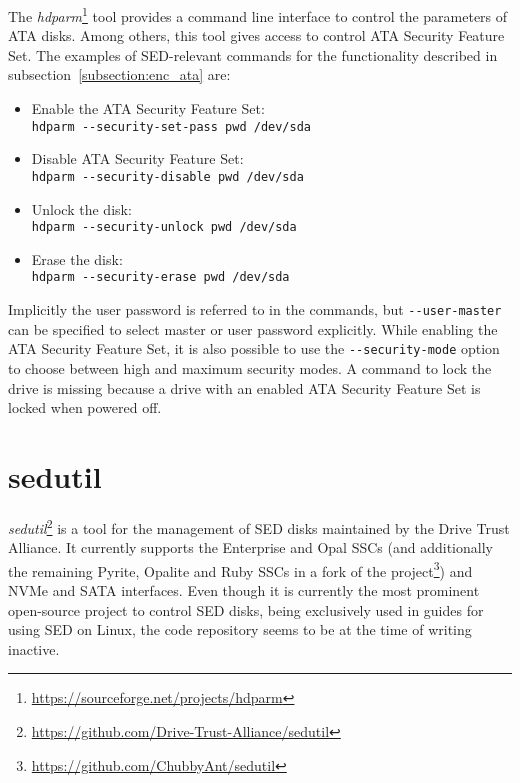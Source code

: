The \emph{hdparm}\footnote{\url{https://sourceforge.net/projects/hdparm}} tool provides a command line interface to control the parameters of ATA disks. Among others, this tool gives access to control ATA Security Feature Set.
The examples of SED-relevant commands for the functionality described in subsection~\ref{subsection:enc_ata} are:
\begin{itemize}
\item Enable the ATA Security Feature Set:\\ \verb|hdparm --security-set-pass pwd /dev/sda|
\item Disable ATA Security Feature Set:\\ \verb|hdparm --security-disable pwd /dev/sda|
\item Unlock the disk:\\ \verb|hdparm --security-unlock pwd /dev/sda|
\item Erase the disk:\\ \verb|hdparm --security-erase pwd /dev/sda|
\end{itemize}
Implicitly the user password is referred to in the commands, but \verb|--user-master| can be specified to select master or user password explicitly. While enabling the ATA Security Feature Set, it is also possible to use the \verb|--security-mode| option to choose between high and maximum security modes.
A command to lock the drive is missing because a drive with an enabled ATA Security Feature Set is locked when powered off.


\section{sedutil}

\emph{sedutil}\footnote{\url{https://github.com/Drive-Trust-Alliance/sedutil}} is a tool for the management of SED disks maintained by the Drive Trust Alliance.
It currently supports the Enterprise and Opal SSCs (and additionally the remaining Pyrite, Opalite and Ruby SSCs in a fork of the project\footnote{\url{https://github.com/ChubbyAnt/sedutil}}) and NVMe and SATA interfaces.
Even though it is currently the most prominent open-source project to control SED disks, being exclusively used in guides for using SED on Linux, the code repository seems to be at the time of writing inactive.

